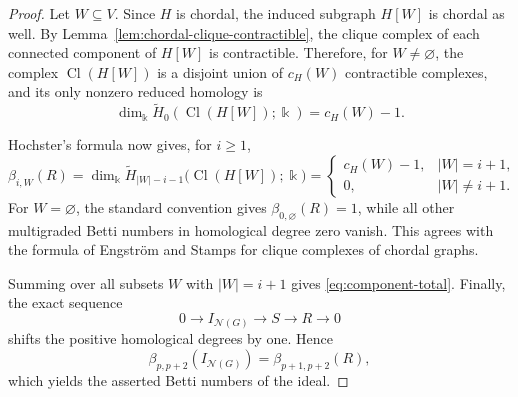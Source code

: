 \documentclass[10pt,a4paper]{amsart}
\numberwithin{equation}{section}
\newcommand{\NN}{\mathcal N}
\newcommand{\Cl}{\operatorname{Cl}}
\begin{document}
	\begin{proof}
		Let \(W\subseteq V\). Since \(H\) is chordal, the induced subgraph \(H[W]\)
		is chordal as well. By Lemma~\ref{lem:chordal-clique-contractible}, the clique
		complex of each connected component of \(H[W]\) is contractible. Therefore,
		for \(W\ne\varnothing\), the complex \(\Cl(H[W])\) is a disjoint union of
		\(c_H(W)\) contractible complexes, and its only nonzero reduced homology is
		\[
		\dim_{\Bbbk}\widetilde H_0(\Cl(H[W]);\Bbbk)=c_H(W)-1.
		\]
		
		Hochster's formula \cite{Hochster1977} now gives, for \(i\ge1\),
		\[
		\beta_{i,W}(R)
		=
		\dim_{\Bbbk}\widetilde H_{|W|-i-1}
		\bigl(\Cl(H[W]);\Bbbk\bigr)
		=
		\begin{cases}
			c_H(W)-1,&|W|=i+1,\\
			0,&|W|\ne i+1.
		\end{cases}
		\]
		For \(W=\varnothing\), the standard convention gives
		\(\beta_{0,\varnothing}(R)=1\), while all other multigraded Betti numbers in
		homological degree zero vanish. This agrees with the formula of Engstr\"om and
		Stamps \cite{EngstromStamps2013} for clique complexes of chordal
		graphs.
		
		Summing over all subsets \(W\) with \(|W|=i+1\) gives
		\eqref{eq:component-total}. Finally, the exact sequence
		\[
		0\longrightarrow I_{\NN(G)}\longrightarrow S\longrightarrow R
		\longrightarrow0
		\]
		shifts the positive homological degrees by one. Hence
		\[
		\beta_{p,p+2}(I_{\NN(G)})=\beta_{p+1,p+2}(R),
		\]
		which yields the asserted Betti numbers of the ideal.
	\end{proof}
	
\end{document}

